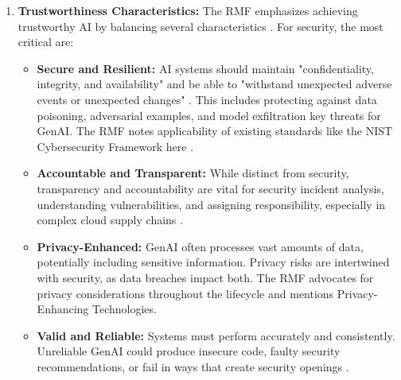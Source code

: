 \begin{enumerate}
    \item \textbf{Trustworthiness Characteristics:} The RMF emphasizes achieving trustworthy AI by balancing several characteristics \cite{tabassi_artificial_2023}. For security, the most critical are:
    \begin{itemize}
      \item \textbf{Secure and Resilient:} AI systems should maintain "confidentiality, integrity, and availability" and be able to "withstand unexpected adverse events or unexpected changes" \cite[p.15]{tabassi_artificial_2023}. This includes protecting against data poisoning, adversarial examples, and model exfiltration key threats for GenAI. The RMF notes applicability of existing standards like the NIST Cybersecurity Framework here \cite[p.15]{tabassi_artificial_2023}.
        \item \textbf{Accountable and Transparent:} While distinct from security, transparency and accountability are vital for security incident analysis, understanding vulnerabilities, and assigning responsibility, especially in complex cloud supply chains \cite{tabassi_artificial_2023}.
        \item \textbf{Privacy-Enhanced:} GenAI often processes vast amounts of data, potentially including sensitive information. Privacy risks are intertwined with security, as data breaches impact both. The RMF advocates for privacy considerations throughout the lifecycle and mentions Privacy-Enhancing Technologies\cite{tabassi_artificial_2023}.
        \item \textbf{Valid and Reliable:} Systems must perform accurately and consistently. Unreliable GenAI could produce insecure code, faulty security recommendations, or fail in ways that create security openings \cite{tabassi_artificial_2023}.
    \end{itemize}


\end{enumerate}
